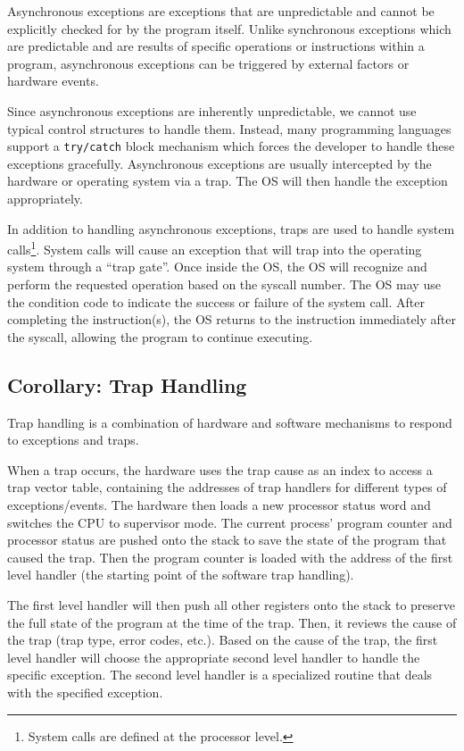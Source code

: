 \documentclass{report}
\begin{document}
Asynchronous exceptions are exceptions that are unpredictable and cannot be explicitly checked for
by the program itself. Unlike synchronous exceptions which are predictable and are results of
specific operations or instructions within a program, asynchronous exceptions can be triggered by
external factors or hardware events.

Since asynchronous exceptions are inherently unpredictable, we cannot use typical control structures
to handle them. Instead, many programming languages support a \texttt{try/catch} block mechanism
which forces the developer to handle these exceptions gracefully. Asynchronous exceptions are
usually intercepted by the hardware or operating system via a trap. The OS will then handle the
exception appropriately. 

In addition to handling asynchronous exceptions, traps are used to handle system calls\footnote{System calls
  are defined at the processor level.}. System calls will cause an exception that will trap into the
operating system through a ``trap gate''. Once inside the OS, the OS will recognize and perform the
requested operation based on the syscall number. The OS may use the condition code to indicate the
success or failure of the system call. After completing the instruction(s), the OS returns to the
instruction immediately after the syscall, allowing the program to continue executing. 


\subsection*{Corollary: Trap Handling}
Trap handling is a combination of hardware and software mechanisms to respond to exceptions and
traps.

When a trap occurs, the hardware uses the trap cause as an index to access a trap vector table,
containing the addresses of trap handlers for different types of exceptions/events. The hardware
then loads a new processor status word and switches the CPU to supervisor mode. The current process'
program counter and processor status are pushed onto the stack to save the state of the program that
caused the trap. Then the program counter is loaded with the address of the first level handler (the
starting point of the software trap handling).

The first level handler will then push all other registers onto the stack to preserve the full state
of the program at the time of the trap. Then, it reviews the cause of the trap (trap type, error
codes, etc.). Based on the cause of the trap, the first level handler will choose the appropriate
second level handler to handle the specific exception. The second level handler is a specialized
routine that deals with the specified exception.
\end{document}
